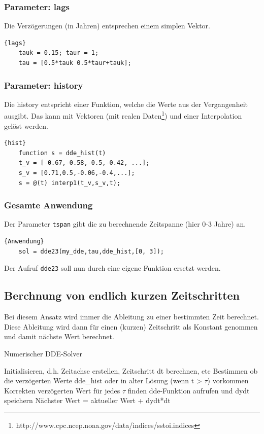 \subsubsection{Parameter: lags}
Die Verzögerungen (in Jahren) entsprechen einem simplen Vektor.
\begin{lstlisting}[style=MATLAB]{lags}
	tauk = 0.15; taur = 1;
	tau = [0.5*tauk 0.5*taur+tauk];
\end{lstlisting}

\subsubsection{Parameter: history}
Die history entspricht einer Funktion, welche die Werte aus der Vergangenheit ausgibt. 
Das kann mit Vektoren (mit realen Daten\footnote{http://www.cpc.ncep.noaa.gov/data/indices/sstoi.indices}) und einer Interpolation gelöst werden.
\begin{lstlisting}[style=MATLAB]{hist}
	function s = dde_hist(t)
	t_v = [-0.67,-0.58,-0.5,-0.42, ...];
	s_v = [0.71,0.5,-0.06,-0.4,...];  
	s = @(t) interp1(t_v,s_v,t);
\end{lstlisting}

\subsubsection{Gesamte Anwendung}
Der Parameter \texttt{tspan} gibt die zu berechnende Zeitspanne (hier 0-3 Jahre) an.
\begin{lstlisting}[style=MATLAB]{Anwendung}
	sol = dde23(my_dde,tau,dde_hist,[0, 3]);
\end{lstlisting}
Der Aufruf \texttt{dde23} soll nun durch eine eigene Funktion ersetzt werden.
 

\subsection{Berchnung von endlich kurzen Zeitschritten}
Bei diesem Ansatz wird immer die Ableitung zu einer bestimmten Zeit berechnet.
Diese Ableitung wird dann für einen (kurzen) Zeitschritt als Konstant genommen und damit nächste Wert berechnet.
\begin{algorithm}
	\caption{Numerischer DDE-Solver}
	\label{algo1}
	\begin{algorithmic}[1]
		\State Initialisieren, d.h. Zeitachse erstellen, Zeitschritt dt berechnen, etc
		\State Bestimmen ob die verzögerten Werte dde\_hist oder in alter Lösung (wenn t > $\tau$) vorkommen
		\State Korrekten verzögerten Wert für jedes $\tau$ finden
		\EndFor
		\State dde-Funktion aufrufen und dydt speichern
		\State Nächster Wert = aktueller Wert + dydt*dt
		\EndFor
	\end{algorithmic}
\end{algorithm}

